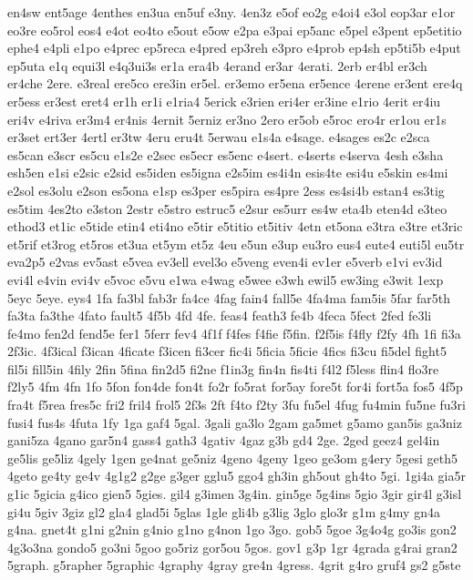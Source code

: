 {en4sw
ent5age
4enthes
en3ua
en5uf
e3ny.
4en3z
e5of
eo2g
e4oi4
e3ol
eop3ar
e1or
eo3re
eo5rol
eos4
e4ot
eo4to
e5out
e5ow
e2pa
e3pai
ep5anc
e5pel
e3pent
ep5etitio
ephe4
e4pli
e1po
e4prec
ep5reca
e4pred
ep3reh
e3pro
e4prob
ep4sh
ep5ti5b
e4put
ep5uta
e1q
equi3l
e4q3ui3s
er1a
era4b
4erand
er3ar
4erati.
2erb
er4bl
er3ch
er4che
2ere.
e3real
ere5co
ere3in
er5el.
er3emo
er5ena
er5ence
4erene
er3ent
ere4q
er5ess
er3est
eret4
er1h
er1i
e1ria4
5erick
e3rien
eri4er
er3ine
e1rio
4erit
er4iu
eri4v
e4riva
er3m4
er4nis
4ernit
5erniz
er3no
2ero
er5ob
e5roc
ero4r
er1ou
er1s
er3set
ert3er
4ertl
er3tw
4eru
eru4t
5erwau
e1s4a
e4sage.
e4sages
es2c
e2sca
es5can
e3scr
es5cu
e1s2e
e2sec
es5ecr
es5enc
e4sert.
e4serts
e4serva
4esh
e3sha
esh5en
e1si
e2sic
e2sid
es5iden
es5igna
e2s5im
es4i4n
esis4te
esi4u
e5skin
es4mi
e2sol
es3olu
e2son
es5ona
e1sp
es3per
es5pira
es4pre
2ess
es4si4b
estan4
es3tig
es5tim
4es2to
e3ston
2estr
e5stro
estruc5
e2sur
es5urr
es4w
eta4b
eten4d
e3teo
ethod3
et1ic
e5tide
etin4
eti4no
e5tir
e5titio
et5itiv
4etn
et5ona
e3tra
e3tre
et3ric
et5rif
et3rog
et5ros
et3ua
et5ym
et5z
4eu
e5un
e3up
eu3ro
eus4
eute4
euti5l
eu5tr
eva2p5
e2vas
ev5ast
e5vea
ev3ell
evel3o
e5veng
even4i
ev1er
e5verb
e1vi
ev3id
evi4l
e4vin
evi4v
e5voc
e5vu
e1wa
e4wag
e5wee
e3wh
ewil5
ew3ing
e3wit
1exp
5eyc
5eye.
eys4
1fa
fa3bl
fab3r
fa4ce
4fag
fain4
fall5e
4fa4ma
fam5is
5far
far5th
fa3ta
fa3the
4fato
fault5
4f5b
4fd
4fe.
feas4
feath3
fe4b
4feca
5fect
2fed
fe3li
fe4mo
fen2d
fend5e
fer1
5ferr
fev4
4f1f
f4fes
f4fie
f5fin.
f2f5is
f4fly
f2fy
4fh
1fi
fi3a
2f3ic.
4f3ical
f3ican
4ficate
f3icen
fi3cer
fic4i
5ficia
5ficie
4fics
fi3cu
fi5del
fight5
fil5i
fill5in
4fily
2fin
5fina
fin2d5
fi2ne
f1in3g
fin4n
fis4ti
f4l2
f5less
flin4
flo3re
f2ly5
4fm
4fn
1fo
5fon
fon4de
fon4t
fo2r
fo5rat
for5ay
fore5t
for4i
fort5a
fos5
4f5p
fra4t
f5rea
fres5c
fri2
fril4
frol5
2f3s
2ft
f4to
f2ty
3fu
fu5el
4fug
fu4min
fu5ne
fu3ri
fusi4
fus4s
4futa
1fy
1ga
gaf4
5gal.
3gali
ga3lo
2gam
ga5met
g5amo
gan5is
ga3niz
gani5za
4gano
gar5n4
gass4
gath3
4gativ
4gaz
g3b
gd4
2ge.
2ged
geez4
gel4in
ge5lis
ge5liz
4gely
1gen
ge4nat
ge5niz
4geno
4geny
1geo
ge3om
g4ery
5gesi
geth5
4geto
ge4ty
ge4v
4g1g2
g2ge
g3ger
gglu5
ggo4
gh3in
gh5out
gh4to
5gi.
1gi4a
gia5r
g1ic
5gicia
g4ico
gien5
5gies.
gil4
g3imen
3g4in.
gin5ge
5g4ins
5gio
3gir
gir4l
g3isl
gi4u
5giv
3giz
gl2
gla4
glad5i
5glas
1gle
gli4b
g3lig
3glo
glo3r
g1m
g4my
gn4a
g4na.
gnet4t
g1ni
g2nin
g4nio
g1no
g4non
1go
3go.
gob5
5goe
3g4o4g
go3is
gon2
4g3o3na
gondo5
go3ni
5goo
go5riz
gor5ou
5gos.
gov1
g3p
1gr
4grada
g4rai
gran2
5graph.
g5rapher
5graphic
4graphy
4gray
gre4n
4gress.
4grit
g4ro
gruf4
gs2
g5ste
}
